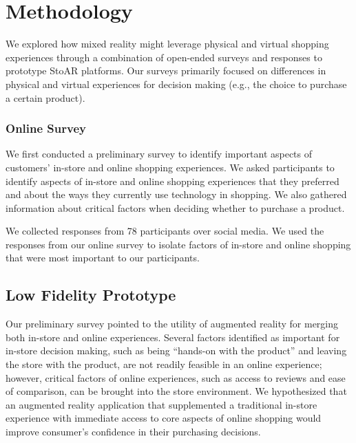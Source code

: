 \section{Methodology}

We explored how mixed reality might leverage physical and virtual shopping experiences through a combination of open-ended surveys and responses to prototype StoAR platforms. Our surveys primarily focused on differences in physical and virtual experiences for decision making (e.g., the choice to purchase a certain product). 

\subsubsection{Online Survey}
We first conducted a preliminary survey to identify important aspects of customers' in-store and online shopping experiences. We asked participants
to identify aspects of in-store and online shopping experiences that they preferred and about the ways they currently use technology in shopping.   We also gathered information about critical factors when deciding whether to purchase a product.  

We collected responses from 78 participants over social media. We used the responses from our online survey to isolate factors of in-store and online shopping that were most important to our participants.   

\subsection{Low Fidelity Prototype}
Our preliminary survey pointed to the utility of augmented reality for merging both in-store and online experiences. Several factors identified as important for in-store decision making, such as being ``hands-on with the product'' and leaving the store with the product, are not readily feasible in an online experience; however, critical factors of online experiences, such as access to reviews and ease of comparison, can be brought into the store environment. We hypothesized that an augmented reality application that supplemented a traditional in-store experience with immediate access to core aspects of online shopping would improve consumer's confidence in their purchasing decisions. 

